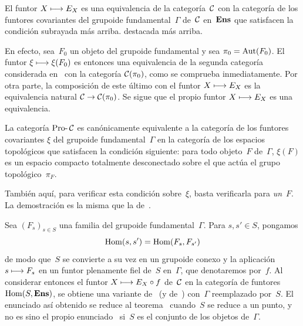 
\begin{proposition}
\label{V.5.8}
El funtor $X\mto E_X$ es una equivalencia de la categoría~$\cal{C}$ con la
categoría de los funtores covariantes del grupoide fundamental~$\Gamma$
de~$\cal{C}$ en~$\Ens$ que satisfacen la condición
{subrayada más arriba.}
{destacada más arriba.}
\end{proposition}

En efecto, sea~$F_0$ un objeto del grupoide fundamental y sea
$\pi_0=\Aut(F_0)$. El funtor $\xi\mto\xi(F_0)$ es entonces una equivalencia
de la segunda categoría considerada en~ con la categoría
$\cal{C}(\pi_0)$, como se comprueba inmediatamente. Por otra parte, la
composición de este último con el funtor $X\mto E_X$ es la equivalencia
natural $\cal{C}\to\cal{C}(\pi_0)$. Se sigue que el propio funtor
$X\mto E_X$ es una equivalencia.

\begin{corollaire}
\label{V.5.9}
La categoría $\Prodash\cal{C}$
es canónicamente equivalente a la categoría de los funtores covariantes
$\xi$ del grupoide fundamental~$\Gamma$ en la categoría de los espacios
topológicos que satisfacen la condición siguiente: para todo objeto~$F$
de~$\Gamma$, $\xi(F)$ es un espacio compacto totalmente desconectado sobre
el que actúa el grupo topológico~$\pi_F$.
\end{corollaire}

También aquí, para verificar esta condición sobre~$\xi$, basta verificarla
para \emph{un}~$F$. La demostración es la misma que la de~.

\begin{remarque}
\label{V.5.10}
Sea $(F_s)_{s\in S}$ una familia
del grupoide fundamental~$\Gamma$. Para $s,s'\in S$, pongamos
$$
\Hom(s,s')=\Hom(F_s,F_{s'})
$$
de modo que~$S$ se convierte a su vez en un grupoide conexo y la aplicación
$s\mto F_s$ en un funtor plenamente fiel de~$S$ en~$\Gamma$, que
denotaremos por~$f$. Al considerar entonces el funtor $X\mto E_X\circ f$
de~$\cal{C}$ en la categoría de funtores $\Hom(S,\Ens)$, se obtiene una
variante de~ (y de~) con~$\Gamma$ reemplazado por~$S$.
El enunciado así obtenido se reduce al teorema~ cuando~$S$ se
reduce a un punto, y no es sino el propio enunciado~ si~$S$ es
el conjunto de los objetos de~$\Gamma$.
\end{remarque}

